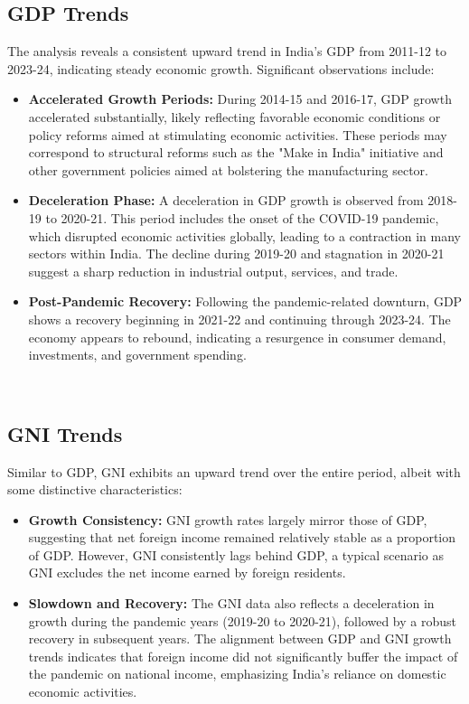 \documentclass[a4paper,12pt]{extarticle} %
\begin{document}
\subsection{GDP Trends}
The analysis reveals a consistent upward trend in India’s GDP from 2011-12 to 2023-24, indicating steady economic growth. Significant observations include:
\begin{itemize}
    \item \textbf{Accelerated Growth Periods:} During 2014-15 and 2016-17, GDP growth accelerated substantially, likely reflecting favorable economic conditions or policy reforms aimed at stimulating economic activities. These periods may correspond to structural reforms such as the "Make in India" initiative and other government policies aimed at bolstering the manufacturing sector.
    \item \textbf{Deceleration Phase:} A deceleration in GDP growth is observed from 2018-19 to 2020-21. This period includes the onset of the COVID-19 pandemic, which disrupted economic activities globally, leading to a contraction in many sectors within India. The decline during 2019-20 and stagnation in 2020-21 suggest a sharp reduction in industrial output, services, and trade.
    \item \textbf{Post-Pandemic Recovery:} Following the pandemic-related downturn, GDP shows a recovery beginning in 2021-22 and continuing through 2023-24. The economy appears to rebound, indicating a resurgence in consumer demand, investments, and government spending.
\end{itemize}\\

\subsection{GNI Trends}
Similar to GDP, GNI exhibits an upward trend over the entire period, albeit with some distinctive characteristics:
\begin{itemize}
    \item \textbf{Growth Consistency:} GNI growth rates largely mirror those of GDP, suggesting that net foreign income remained relatively stable as a proportion of GDP. However, GNI consistently lags behind GDP, a typical scenario as GNI excludes the net income earned by foreign residents.
    \item \textbf{Slowdown and Recovery:} The GNI data also reflects a deceleration in growth during the pandemic years (2019-20 to 2020-21), followed by a robust recovery in subsequent years. The alignment between GDP and GNI growth trends indicates that foreign income did not significantly buffer the impact of the pandemic on national income, emphasizing India’s reliance on domestic economic activities.
\end{itemize}\\
\cite{gdp2023}
\end{document}
